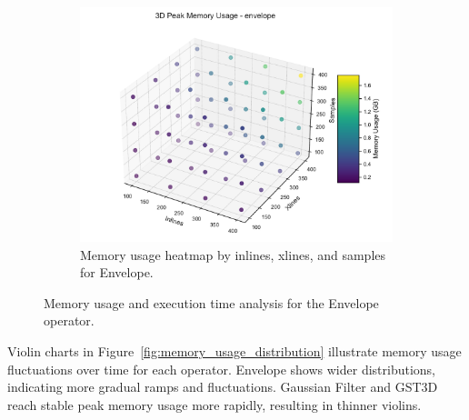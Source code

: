 \begin{figure}[htbp]
\begin{subfigure}[t]{0.49\textwidth}
    \end{subfigure}
    \hfill
    \begin{subfigure}[t]{0.49\textwidth}
        \centering
        \includegraphics[width=\textwidth]{assets/images/05/memory_usage_inlines_xlines_samples_heatmap_envelope}
        \caption{Memory usage heatmap by inlines, xlines, and samples for Envelope.}
    \end{subfigure}
    \caption{Memory usage and execution time analysis for the Envelope operator.}
    \label{fig:memory_usage_by_configuration_envelope}
\end{figure}

Violin charts in Figure~\ref{fig:memory_usage_distribution} illustrate memory usage fluctuations over time for each operator.
Envelope shows wider distributions, indicating more gradual ramps and fluctuations.
Gaussian Filter and \ac{GST3D} reach stable peak memory usage more rapidly, resulting in thinner violins.

